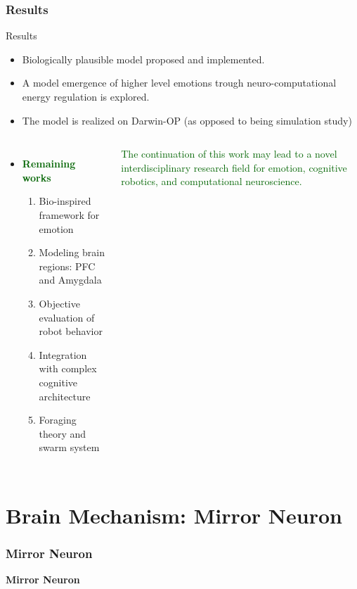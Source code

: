 \documentclass{beamer}
\begin{document}
\begin{frame}
\frametitle{Results}



\begin{block}{Results}\scriptsize
\begin{itemize}
\item Biologically plausible model proposed and implemented.
\item A model emergence of higher level emotions trough neuro-computational
energy regulation is explored.
\item The model is realized on Darwin-OP (as opposed to being simulation study)

\end{itemize}

\end{block}




\begin{columns}[l|c]
  \column{2.9in}  %

\begin{itemize}
\item \textcolor{darkgreen}{\textbf{Remaining works}}
\begin{enumerate}\scriptsize
\item Bio-inspired framework for emotion
\item Modeling brain regions: PFC and Amygdala
\item Objective evaluation of robot behavior
\item Integration with complex cognitive architecture
\item Foraging theory and swarm system
\end{enumerate}



\end{itemize}
  		
  		
\column{1.8in}
\begin{block}{}
\textcolor{darkgreen}{The continuation of this work may lead to a novel interdisciplinary research 
field for emotion, cognitive robotics, and computational neuroscience.}
\end{block}

\end{columns}

 
\end{frame}

\section{Brain Mechanism: Mirror Neuron }
\begin{frame}
\frametitle{Mirror Neuron}

\centering \huge \textbf{Mirror Neuron}

\end{frame}
\end{document}
